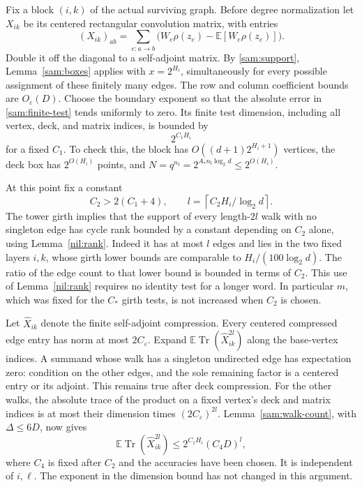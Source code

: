 Fix a block \((i,k)\) of the actual surviving graph.  Before degree
normalization let \(X_{ik}\) be its centered rectangular convolution
matrix, with entries
\[
 (X_{ik})_{ab}=
 \sum_{e:a\to b}
 \bigl(W_e\rho(z_e)-\mathbb E[W_e\rho(z_e)]\bigr).
\]
Double it off the diagonal to a self-adjoint matrix.  By
\eqref{sam:support}, Lemma~\ref{sam:boxes} applies with
\(x=2^{H_i}\), simultaneously for every possible assignment of
these finitely many edges.  The row and column coefficient bounds
are \(O_\varepsilon(D)\).  Choose the boundary exponent so that
the absolute error in \eqref{sam:finite-test} tends uniformly to
zero.  Its finite test dimension, including all vertex, deck, and
matrix indices, is bounded by
\begin{equation}\label{sam:dimension}
 2^{C_1H_i}
\end{equation}
for a fixed \(C_1\).  To check this, the block has
\(O((d+1)2^{H_i+1})\) vertices, the deck box has
\(2^{O(H_i)}\) points, and
\(N=q^{n_{\mathrm f}}=2^{A_*n_{\mathrm f}\log_2d}
 \le2^{O(H_i)}\).

At this point fix a constant
\begin{equation}\label{sam:C2-order}
 C_2>2(C_1+4),\qquad
 l=\left\lceil C_2H_i/\log_2d\right\rceil.
\end{equation}
The tower girth implies that the support of every length-\(2l\)
walk with no singleton edge has cycle rank bounded by a constant
depending on \(C_2\) alone, using Lemma~\ref{nil:rank}.  Indeed it
has at most \(l\) edges and lies in the two fixed layers \(i,k\),
whose girth lower bounds are comparable to
\(H_i/(100\log_2d)\).  The ratio of the edge count to that lower
bound is bounded in terms of \(C_2\).  This use of
Lemma~\ref{nil:rank} requires no identity test for a longer word.
In particular \(m\), which was fixed for the \(C_*\) girth
tests, is not increased when \(C_2\) is chosen.

Let \(\widehat X_{ik}\) denote the finite self-adjoint compression.
Every centered compressed edge entry has norm at most
\(2C_\varepsilon\).  Expand
\(\mathbb E\operatorname{Tr}(\widehat X_{ik}^{2l})\) along the
base-vertex indices.  A summand whose walk has a singleton
undirected edge has expectation zero: condition on the other
edges, and the sole remaining factor is a centered entry or its
adjoint.  This remains true after deck compression.  For the other
walks, the absolute trace of the product on a fixed vertex's deck
and matrix indices is at most their dimension times
\((2C_\varepsilon)^{2l}\).  Lemma~\ref{sam:walk-count}, with
\(\Delta\le6D\), now gives
\begin{equation}\label{sam:block-moment}
 \mathbb E\operatorname{Tr}(\widehat X_{ik}^{2l})
 \le 2^{C_1H_i}(C_4D)^l,
\end{equation}
where \(C_4\) is fixed after \(C_2\) and the accuracies have
been chosen.  It is independent of \(i,\ell\).  The exponent in
the dimension bound has not changed in this argument.

